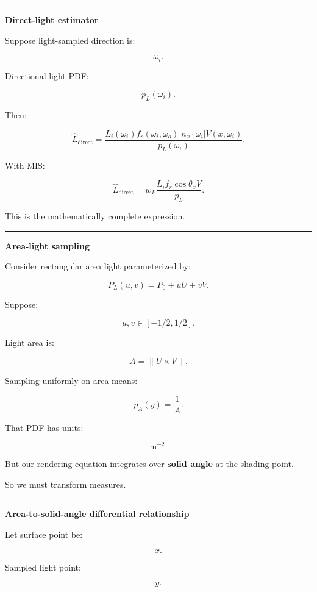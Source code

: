 \begin{center}\rule{0.5\linewidth}{0.5pt}\end{center}

\textbf{Direct-light estimator}

Suppose light-sampled direction is:

\[
\omega_i.
\]

Directional light PDF:

\[
p_L(\omega_i).
\]

Then:

\[
\boxed{
\hat L_{\text{direct}}
=
\frac{
L_i(\omega_i)
f_r(\omega_i,\omega_o)
|n_x\cdot\omega_i|
V(x,\omega_i)
}{
p_L(\omega_i)
}.
}
\]

With MIS:

\[
\boxed{
\hat L_{\text{direct}}
=
w_L
\frac{
L_i f_r\cos\theta_xV
}{
p_L
}.
}
\]

This is the mathematically complete expression.

\begin{center}\rule{0.5\linewidth}{0.5pt}\end{center}

\textbf{Area-light sampling}

Consider rectangular area light parameterized by:

\[
P_L(u,v)
=
P_0+
uU+
vV.
\]

Suppose:

\[
u,v\in[-1/2,1/2].
\]

Light area is:

\[
\boxed{
A=
\|U\times V\|.
}
\]

Sampling uniformly on area means:

\[
p_A(y)
=
\frac1A.
\]

That PDF has units:

\[
\mathrm{m}^{-2}.
\]

But our rendering equation integrates over \textbf{solid angle} at the shading point.

So we must transform measures.

\begin{center}\rule{0.5\linewidth}{0.5pt}\end{center}

\textbf{Area-to-solid-angle differential relationship}

Let surface point be:

\[
x.
\]

Sampled light point:

\[
y.
\]

